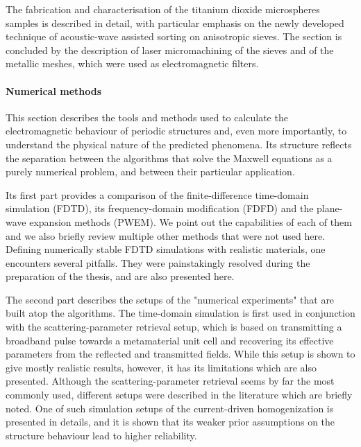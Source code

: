 The fabrication and characterisation of the titanium dioxide microspheres samples is described in detail, with particular emphasis on the newly developed technique of acoustic-wave assisted sorting on anisotropic sieves. The section is concluded by the description of laser micromachining of the sieves and of the metallic meshes, which were used as electromagnetic filters.

\paragraph{Numerical methods} %
This section describes the tools and methods used to calculate the electromagnetic behaviour of periodic structures and, even more importantly, to understand the physical nature of the predicted phenomena. Its structure reflects the separation between the algorithms that solve the Maxwell equations as a purely numerical problem, and between their particular application.

Its first part provides a comparison of the finite-difference time-domain simulation (FDTD), its frequency-domain modification (FDFD) 
and the plane-wave expansion methods (PWEM).
We point out the capabilities of each of them and we also briefly review multiple other methods that were not used here. %
Defining numerically stable FDTD simulations with realistic materials, one encounters several pitfalls. They were painstakingly resolved during the preparation of the thesis, and are also presented here.

The second part describes the setups of the "numerical experiments" that are built atop the algorithms. 
The time-domain simulation is first used in conjunction with the scattering-parameter retrieval setup, which is based on transmitting a broadband pulse towards a metamaterial unit cell and recovering its effective parameters from the reflected and transmitted fields. While this setup is shown to give mostly realistic results, however, it has its limitations which are also presented. Although the scattering-parameter retrieval seems by far the most commonly used, different setups were described in the literature which are briefly noted.
One of such simulation setups of the current-driven homogenization is presented in details, and it is shown that its weaker prior assumptions on the structure behaviour lead to higher reliability.
